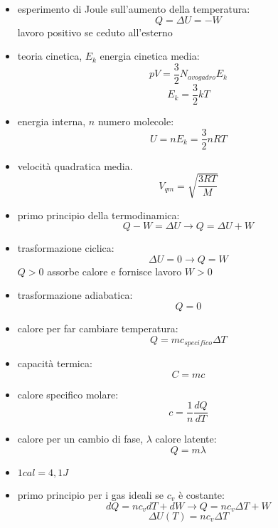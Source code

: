 \documentclass[a4paper,12pt, oneside]{book}
\begin{document}
\begin{itemize}
\begin{itemize}
\end{itemize}
\item esperimento di Joule sull'aumento della temperatura:
$$Q=\Delta U=-W$$
lavoro positivo se ceduto all'esterno
\item teoria cinetica, $E_k$ energia cinetica media:
$$pV=\frac{3}{2}N_{avogadro}E_k$$
$$E_k=\frac{3}{2}kT$$
\item energia interna, $n$ numero molecole:
$$U=nE_k=\frac{3}{2}nRT$$
\item velocità quadratica media.
$$V_{qm}=\sqrt{\frac{3RT}{M}}$$
\item primo principio della termodinamica:
$$Q-W=\Delta U\to Q=\Delta U+W$$
\item trasformazione ciclica:
$$\Delta U=0\to Q=W$$
$Q>0$ assorbe calore e fornisce lavoro $W>0$
\item trasformazione adiabatica:
$$Q=0$$
\item calore per far cambiare temperatura:
$$Q=mc_{specifico}\Delta T$$
\item capacità termica:
$$C=mc$$
\item calore specifico molare:
$$c=\frac{1}{n}\frac{dQ}{dT}$$
\item calore per un cambio di fase, $\lambda$ calore latente:
$$Q=m\lambda$$
\item $1 cal=4,1J$
\item primo principio per i gas ideali se $c_v$ è costante:
$$dQ=nc_vdT+dW\longrightarrow Q=nc_v\Delta T+W$$
$$\Delta U(T)=nc_v\Delta T$$
\end{itemize}
\end{document}
